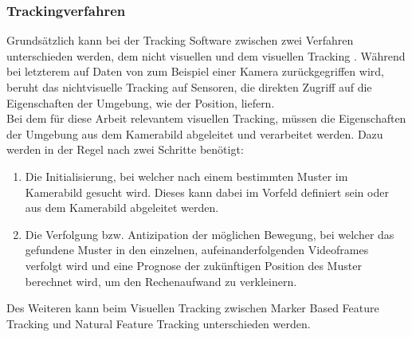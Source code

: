 \subsubsection{Trackingverfahren}
Grundsätzlich kann bei der Tracking Software zwischen zwei Verfahren unterschieden werden, dem nicht visuellen und dem visuellen Tracking \citep[S. 26]{mehler-bicher:augmented-reality}. Während bei letzterem auf Daten von zum Beispiel einer Kamera zurückgegriffen wird, beruht das nichtvisuelle Tracking auf Sensoren, die direkten Zugriff auf die Eigenschaften der Umgebung, wie der Position, liefern. \\
Bei dem für diese Arbeit relevantem visuellen Tracking, müssen die Eigenschaften der Umgebung aus dem Kamerabild abgeleitet und verarbeitet werden. Dazu werden in der Regel nach \citet[S. 26]{mehler-bicher:augmented-reality} zwei Schritte benötigt:
\begin{enumerate}
\item Die Initialisierung, bei welcher nach einem bestimmten Muster im Kamerabild gesucht wird. Dieses kann dabei im Vorfeld definiert sein oder aus dem Kamerabild abgeleitet werden.
\item Die Verfolgung bzw. Antizipation der möglichen Bewegung, bei welcher das gefundene Muster in den einzelnen, aufeinanderfolgenden Videoframes verfolgt wird und eine Prognose der zukünftigen Position des Muster berechnet wird, um den Rechenaufwand zu verkleinern.
\end{enumerate}
Des Weiteren kann beim Visuellen Tracking zwischen Marker Based Feature Tracking und Natural Feature Tracking unterschieden werden. 

